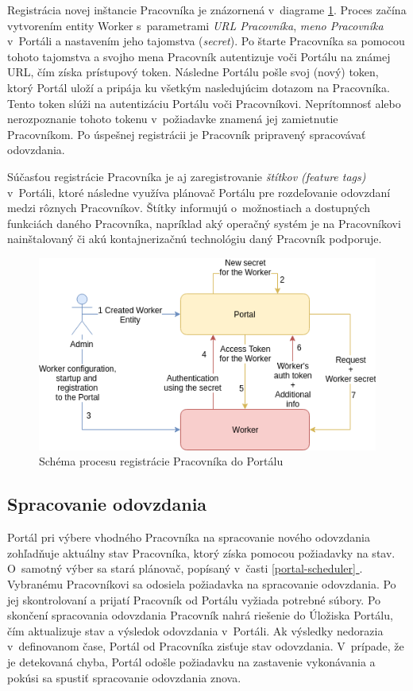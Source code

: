 \documentclass[
  digital, %
  oneside, %
  table,   %
  lof,     %
  lot,   %
]{fithesis3}
\newcommand*{\fullref}[1]{\hyperref[{#1}]{\ref*{#1} \nameref*{#1}}}
\begin{document}
Registrácia novej inštancie Pracovníka je znázornená v~diagrame \ref{fig:worker-reg}. Proces začína vytvorením entity Worker s~parametrami \emph{URL Pracovníka}, \emph{meno Pracovníka} v~Portáli a nastavením jeho tajomstva (\emph{secret}). Po štarte Pracovníka sa pomocou tohoto tajomstva a svojho mena Pracovník autentizuje voči Portálu na známej URL, čím získa prístupový token. Následne Portálu pošle svoj (nový) token, ktorý Portál uloží a pripája ku všetkým nasledujúcim dotazom na Pracovníka. Tento token slúži na autentizáciu Portálu voči Pracovníkovi. Neprítomnosť alebo nerozpoznanie tohoto tokenu v~požiadavke znamená jej zamietnutie Pracovníkom. Po úspešnej registrácii je Pracovník pripravený spracovávať odovzdania.

Súčasťou registrácie Pracovníka je aj zaregistrovanie \emph{štítkov (feature tags)} v~Portáli, ktoré následne využíva plánovač Portálu pre rozdeľovanie odovzdaní medzi rôznych Pracovníkov. Štítky informujú o~možnostiach a dostupných funkciách daného Pracovníka, napríklad aký operačný systém je na Pracovníkovi nainštalovaný či akú kontajnerizačnú technológiu daný Pracovník podporuje. 

\begin{figure}[!ht]
  \begin{center}
    \includegraphics[width=\textwidth]{imgs/worker-reg.png}
  \end{center}
    \caption{Schéma procesu registrácie Pracovníka do Portálu}
    \label{fig:worker-reg}
\end{figure}

\subsection{Spracovanie odovzdania}
Portál pri výbere vhodného Pracovníka na spracovanie nového odovzdania zohľadňuje aktuálny stav Pracovníka, ktorý získa pomocou požiadavky na stav. O~samotný výber sa stará plánovač, popísaný v~časti \fullref{portal-scheduler}. Vybranému Pracovníkovi sa odosiela požiadavka na spracovanie odovzdania. Po jej skontrolovaní a prijatí Pracovník od Portálu vyžiada potrebné súbory. Po skončení spracovania odovzdania Pracovník nahrá riešenie do Úložiska Portálu, čím aktualizuje stav a výsledok odovzdania v~Portáli. Ak výsledky nedorazia v~definovanom čase, Portál od Pracovníka zisťuje stav odovzdania. V~prípade, že je detekovaná chyba, Portál odošle požiadavku na zastavenie vykonávania a pokúsi sa spustiť spracovanie odovzdania znova. 
\end{document}
